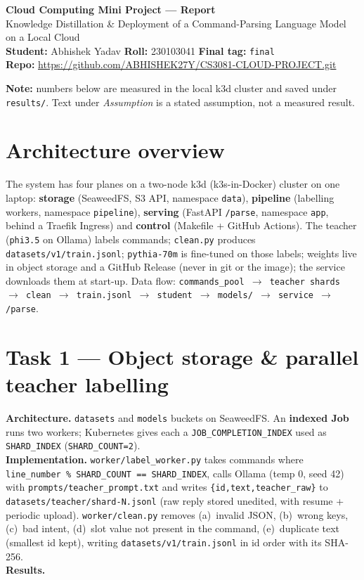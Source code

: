 \documentclass[10pt,a4paper]{article}
\newcommand{\code}[1]{\texttt{\small #1}}
\begin{document}
\begin{center}
  {\LARGE\bfseries Cloud Computing Mini Project --- Report}\\[2pt]
  {\normalsize Knowledge Distillation \& Deployment of a Command-Parsing Language Model on a Local Cloud}\\[6pt]
  \textbf{Student:} Abhishek Yadav \quad\textbf{Roll:} 230103041 \quad\textbf{Final tag:} \code{final}\\[2pt]
  \textbf{Repo:} \url{https://github.com/ABHISHEK27Y/CS3081-CLOUD-PROJECT.git}
\end{center}

\noindent\colorbox{gray!12}{\parbox{\dimexpr\textwidth-2\fboxsep\relax}{\small
\textbf{Note:} numbers below are measured in the local k3d cluster and saved under \code{results/}.
Text under \textit{Assumption} is a stated assumption, not a measured result.}}

\section{Architecture overview}
The system has four planes on a two-node k3d (k3s-in-Docker) cluster on one laptop: \textbf{storage} (SeaweedFS, S3 API, namespace
\code{data}), \textbf{pipeline} (labelling workers, namespace \code{pipeline}), \textbf{serving} (FastAPI
\code{/parse}, namespace \code{app}, behind a Traefik Ingress) and \textbf{control} (Makefile + GitHub
Actions). The teacher (\code{phi3.5} on Ollama) labels commands; \code{clean.py} produces
\code{datasets/v1/train.jsonl}; \code{pythia-70m} is fine-tuned on those labels; weights live in object
storage and a GitHub Release (never in git or the image); the service downloads them at start-up. Data flow:
\code{commands\_pool $\rightarrow$ teacher shards $\rightarrow$ clean $\rightarrow$ train.jsonl $\rightarrow$
student $\rightarrow$ models/ $\rightarrow$ service $\rightarrow$ /parse}.

\section{Task 1 --- Object storage \& parallel teacher labelling}
\textbf{Architecture.} \code{datasets} and \code{models} buckets on SeaweedFS. An \textbf{indexed Job} runs
two workers; Kubernetes gives each a \code{JOB\_COMPLETION\_INDEX} used as \code{SHARD\_INDEX}
(\code{SHARD\_COUNT=2}).\\
\textbf{Implementation.} \code{worker/label\_worker.py} takes commands where
\code{line\_number \% SHARD\_COUNT == SHARD\_INDEX}, calls Ollama (temp 0, seed 42) with
\code{prompts/teacher\_prompt.txt} and writes \code{\{id,text,teacher\_raw\}} to
\code{datasets/teacher/shard-N.jsonl} (raw reply stored unedited, with resume + periodic upload).
\code{worker/clean.py} removes (a)~invalid JSON, (b)~wrong keys, (c)~bad intent, (d)~slot value not present
in the command, (e)~duplicate text (smallest id kept), writing \code{datasets/v1/train.jsonl} in id order
with its SHA-256.\\
\textbf{Results.}
\end{document}
